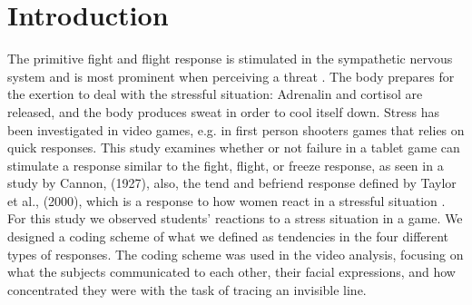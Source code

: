 \section*{Introduction}
The primitive fight and flight response is stimulated in the sympathetic nervous system and is most prominent when perceiving a threat \cite{bodily_changes}. The body prepares for the exertion to deal with the stressful situation: Adrenalin and cortisol are released, and the body produces sweat in order to cool itself down. Stress has been investigated in video games, e.g. in first person shooters games that relies on quick responses. This study examines whether or not failure in a tablet game can stimulate a response similar to the fight, flight, or freeze response, as seen in a study by Cannon, (1927), also, the tend and befriend response defined by Taylor et al., (2000), which is a response to how women react in a stressful situation \cite{tendbefriend}. For this study we observed students’ reactions to a stress situation in a game. We designed a coding scheme of what we defined as tendencies in the four different types of responses. The coding scheme was used in the video analysis, focusing on what the subjects communicated to each other, their facial expressions, and how concentrated they were with the task of tracing an invisible line. 
